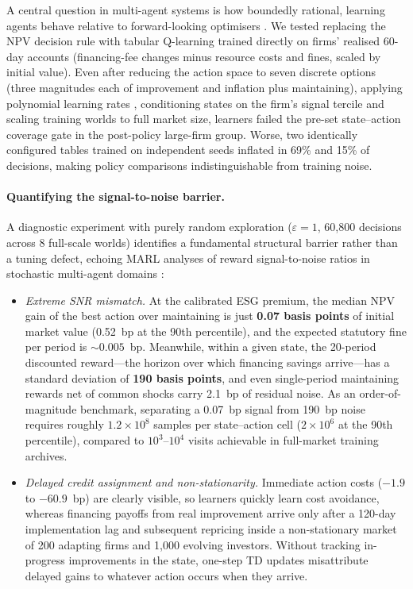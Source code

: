 \documentclass[11pt]{article}
\begin{document}
A central question in multi-agent systems is how boundedly rational, learning agents behave relative to forward-looking optimisers \citep{shoham2007multiagent,busoniu2008comprehensive,hernandezleal2019survey}. We tested replacing the NPV decision rule with tabular Q-learning \citep{watkins1992qlearning} trained directly on firms' realised 60-day accounts (financing-fee changes minus resource costs and fines, scaled by initial value). Even after reducing the action space to seven discrete options (three magnitudes each of improvement and inflation plus maintaining), applying polynomial learning rates \citep{evendar2003learning}, conditioning states on the firm's signal tercile and scaling training worlds to full market size, learners failed the pre-set state--action coverage gate in the post-policy large-firm group. Worse, two identically configured tables trained on independent seeds inflated in 69\% and 15\% of decisions, making policy comparisons indistinguishable from training noise.

\paragraph{Quantifying the signal-to-noise barrier.}
A diagnostic experiment with purely random exploration ($\varepsilon = 1$, 60,800 decisions across 8 full-scale worlds) identifies a fundamental structural barrier rather than a tuning defect, echoing MARL analyses of reward signal-to-noise ratios in stochastic multi-agent domains \citep{agogino2008analyzing}:
\begin{itemize}[leftmargin=*]
\item \emph{Extreme SNR mismatch.} At the calibrated ESG premium, the median NPV gain of the best action over maintaining is just \textbf{0.07 basis points} of initial market value (0.52~bp at the 90th percentile), and the expected statutory fine per period is $\sim 0.005$~bp. Meanwhile, within a given state, the 20-period discounted reward---the horizon over which financing savings arrive---has a standard deviation of \textbf{190 basis points}, and even single-period maintaining rewards net of common shocks carry 2.1~bp of residual noise. As an order-of-magnitude benchmark, separating a 0.07~bp signal from 190~bp noise requires roughly $1.2\times10^{8}$ samples per state--action cell ($2\times10^{6}$ at the 90th percentile), compared to $10^3$--$10^4$ visits achievable in full-market training archives.
\item \emph{Delayed credit assignment and non-stationarity.} Immediate action costs ($-1.9$ to $-60.9$~bp) are clearly visible, so learners quickly learn cost avoidance, whereas financing payoffs from real improvement arrive only after a 120-day implementation lag and subsequent repricing inside a non-stationary market of 200 adapting firms and 1,000 evolving investors. Without tracking in-progress improvements in the state, one-step TD updates misattribute delayed gains to whatever action occurs when they arrive.
\end{itemize}
\end{document}
